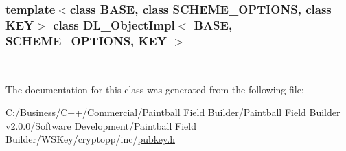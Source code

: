 \subsubsection*{template$<$class BASE, class SCHEME\_\-OPTIONS, class KEY$>$ class DL\_\-ObjectImpl$<$ BASE, SCHEME\_\-OPTIONS, KEY $>$}

\_\- 

The documentation for this class was generated from the following file:\begin{DoxyCompactItemize}
\item 
C:/Business/C++/Commercial/Paintball Field Builder/Paintball Field Builder v2.0.0/Software Development/Paintball Field Builder/WSKey/cryptopp/inc/\hyperlink{pubkey_8h}{pubkey.h}\end{DoxyCompactItemize}
